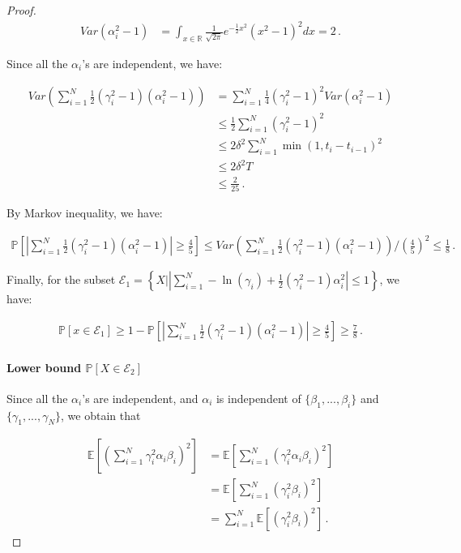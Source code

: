 \documentclass{article}
\theoremstyle{definition}
\begin{document}
\begin{proof}
\begin{align*}
Var(\alpha_{i}^{2}-1)&=\int_{x\in\mathbb{R}}\frac{1}{\sqrt{2\pi}}e^{-\frac{1}{2}x^{2}}(x^{2}-1)^{2}dx=2\,.
\end{align*}

Since all the $\alpha_{i}$'s are independent, we have:

\begin{align*}
Var\left(\sum_{i=1}^{N}\frac{1}{2}(\gamma^{2}_{i}-1)(\alpha^{2}_{i}-1)\right)
&=\sum_{i=1}^{N}\frac{1}{4}(\gamma^{2}_{i}-1)^{2}Var(\alpha^{2}_{i}-1)\\
&\leq \frac{1}{2}\sum_{i=1}^{N}(\gamma^{2}_{i}-1)^{2}\\
&\leq 2\delta^{2}\sum_{i=1}^{N}\min(1,t_{i}-t_{i-1})^{2}\\
&\leq 2\delta^{2}T\\
&\leq \frac{2}{25}\,.
\end{align*}

By Markov inequality, we have:

\begin{align*}
\mathbb{P}\left[\left\vert\sum_{i=1}^{N}\frac{1}{2}(\gamma^{2}_{i}-1)(\alpha^{2}_{i}-1) \right\vert \geq \frac{4}{5}\right]\leq Var\left(\sum_{i=1}^{N}\frac{1}{2}(\gamma^{2}_{i}-1)(\alpha^{2}_{i}-1)\right)/\left(\frac{4}{5}\right)^{2}\leq \frac{1}{8}\,.
\end{align*}

Finally, for the subset $\mathcal{E}_{1}=\left\{X\big\vert \left\vert\sum_{i=1}^{N}-\ln(\gamma_{i})+\frac{1}{2}(\gamma^{2}_{i}-1)\alpha_{i}^{2}  \right\vert\leq 1   \right\}$, we have:

\begin{align*}
\mathbb{P}\left[x\in\mathcal{E}_{1}\right]\geq 1-\mathbb{P}\left[\left\vert\sum_{i=1}^{N}\frac{1}{2}(\gamma^{2}_{i}-1)(\alpha^{2}_{i}-1) \right\vert \geq \frac{4}{5}\right]\geq \frac{7}{8}\,.
\end{align*}

\paragraph{Lower bound $\mathbb{P}[X\in\mathcal{E}_{2}]$}

Since all the $\alpha_{i}$'s are independent, and $\alpha_{i}$ is independent of $\{\beta_{1},...,\beta_{i}\}$ and $\{\gamma_{1},...,\gamma_{N}\}$, we obtain that 

\begin{align*}
\mathbb{E}\left[\left(\sum_{i=1}^{N} \gamma_{i}^{2}\alpha_{i}\beta_{i}\right)^{2}\right]
&=\mathbb{E}\left[\sum_{i=1}^{N}(\gamma_{i}^{2}\alpha_{i}\beta_{i})^{2}\right]\\
&=\mathbb{E}\left[\sum_{i=1}^{N}(\gamma_{i}^{2}\beta_{i})^{2}\right]\\
&=\sum_{i=1}^{N}\mathbb{E}\left[(\gamma_{i}^{2}\beta_{i})^{2}\right]\,.
\end{align*}


\end{proof}
\end{document}

